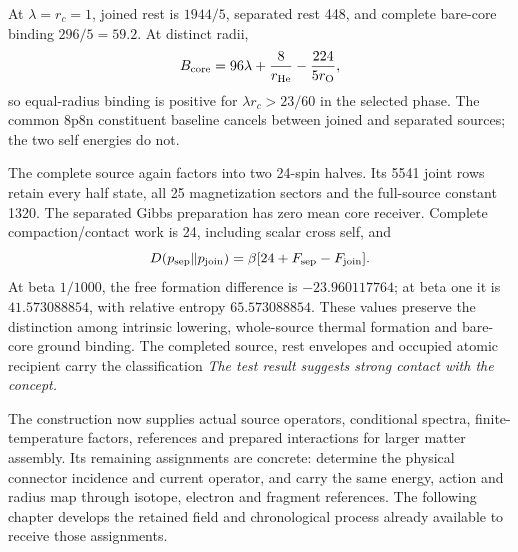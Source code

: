 At \(\lambda=r_c=1\), joined rest is \(1944/5\), separated rest 448,
and complete bare-core binding \(296/5=59.2\). At distinct radii,
\[
 B_{\rm core}=96\lambda+\frac8{r_{\rm He}}
                    -\frac{224}{5r_{\rm O}},
\]
so equal-radius binding is positive for \(\lambda r_c>23/60\) in the
selected phase. The common 8p8n constituent baseline cancels between
joined and separated sources; the two self energies do not.

The complete source again factors into two 24-spin halves. Its 5541
joint rows retain every half state, all 25 magnetization sectors and
the full-source constant 1320. The separated Gibbs preparation has
zero mean core receiver. Complete compaction/contact work is 24,
including scalar cross self, and
\[
 D(p_{\rm sep}\Vert p_{\rm join})
       =\beta[24+F_{\rm sep}-F_{\rm join}].
\]
At beta \(1/1000\), the free formation difference is \(-23.960117764\);
at beta one it is \(41.573088854\), with relative entropy
\(65.573088854\). These values preserve the distinction among intrinsic
lowering, whole-source thermal formation and bare-core ground binding.
The completed source, rest envelopes and occupied atomic recipient carry
the classification \emph{The test result suggests strong contact with
the concept.}

The construction now supplies actual source operators, conditional spectra,
finite-temperature factors, references and prepared interactions for larger
matter assembly. Its remaining assignments are concrete: determine the
physical connector incidence and current operator, and carry the same
energy, action and radius map through isotope, electron and fragment
references. The following chapter develops the retained field and chronological
process already available to receive those assignments.
